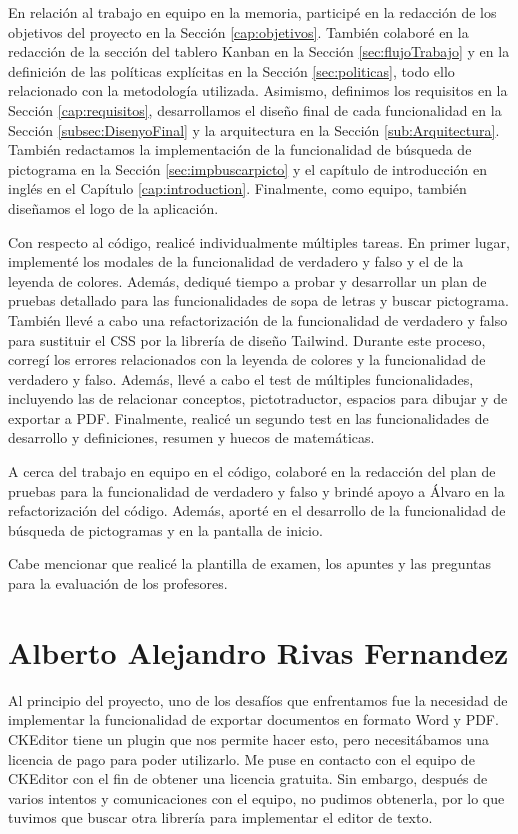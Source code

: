 En relación al trabajo en equipo en la memoria, participé en la redacción de los objetivos del proyecto en la Sección \ref{cap:objetivos}. También colaboré en la redacción de la sección del tablero Kanban en la Sección \ref{sec:flujoTrabajo} y en la definición de las políticas explícitas en la Sección \ref{sec:politicas}, todo ello relacionado con la metodología utilizada. Asimismo, definimos los requisitos en la Sección \ref{cap:requisitos}, desarrollamos el diseño final de cada funcionalidad en la Sección \ref{subsec:DisenyoFinal} y la arquitectura en la Sección \ref{sub:Arquitectura}. También redactamos la implementación de la funcionalidad de búsqueda de pictograma en la Sección \ref{sec:impbuscarpicto} y el capítulo de introducción en inglés en el Capítulo \ref{cap:introduction}. Finalmente, como equipo, también diseñamos el logo de la aplicación.

Con respecto al código, realicé individualmente múltiples tareas. En primer lugar, implementé los modales de la funcionalidad de verdadero y falso y el de la leyenda de colores. Además, dediqué tiempo a probar y desarrollar un plan de pruebas detallado para las funcionalidades de sopa de letras y buscar pictograma. También llevé a cabo una refactorización de la funcionalidad de verdadero y falso para sustituir el CSS por la librería de diseño Tailwind. Durante este proceso, corregí los errores relacionados con la leyenda de colores y la funcionalidad de verdadero y falso. Además, llevé a cabo el test de múltiples funcionalidades, incluyendo las de relacionar conceptos, pictotraductor, espacios para dibujar y de exportar a PDF. Finalmente, realicé un segundo test en las funcionalidades de desarrollo y definiciones, resumen y huecos de matemáticas.

A cerca del trabajo en equipo en el código, colaboré en la redacción del plan de pruebas para la funcionalidad de verdadero y falso y brindé apoyo a Álvaro en la refactorización del código. Además, aporté en el desarrollo de la funcionalidad de búsqueda de pictogramas y en la pantalla de inicio.

Cabe mencionar que realicé la plantilla de examen, los apuntes y las preguntas para la evaluación de los profesores.

\section{Alberto Alejandro Rivas Fernandez}
Al principio del proyecto, uno de los desafíos que enfrentamos fue la necesidad de implementar la funcionalidad de exportar documentos en formato Word y PDF. CKEditor tiene un plugin que nos permite hacer esto, pero necesitábamos una licencia de pago para poder utilizarlo. Me puse en contacto con el equipo de CKEditor con el fin de obtener una licencia gratuita. Sin embargo, después de varios intentos y comunicaciones con el equipo, no pudimos obtenerla, por lo que tuvimos que buscar otra librería para implementar el editor de texto.

